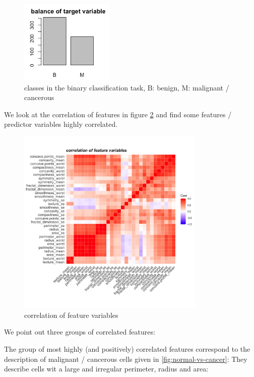 \documentclass[]{article}
\begin{document}
\begin{figure}
    \centering
    \includegraphics[width=0.4\textwidth]{images/binary-classification.png}
    \caption{classes in the binary classification task, B: benign, M: malignant / cancerous}
    \label{fig:bin_class}
\end{figure}

We look at the correlation of features in figure \ref{fig:cor-1} and
find some features / predictor variables highly correlated.

\begin{figure}
    \centering
    \includegraphics[width=0.8\textwidth]{images/correlation-features.png}
    \caption{correlation of feature variables}
    \label{fig:cor-1}
\end{figure}

We point out three groups of correlated features:

The group of most highly (and positively) correlated features correspond
to the description of malignant / cancerous cells given in
\ref{fig:normal-vs-cancer}: They describe cells wit a large and
irregular perimeter, radius and area:
\end{document}
